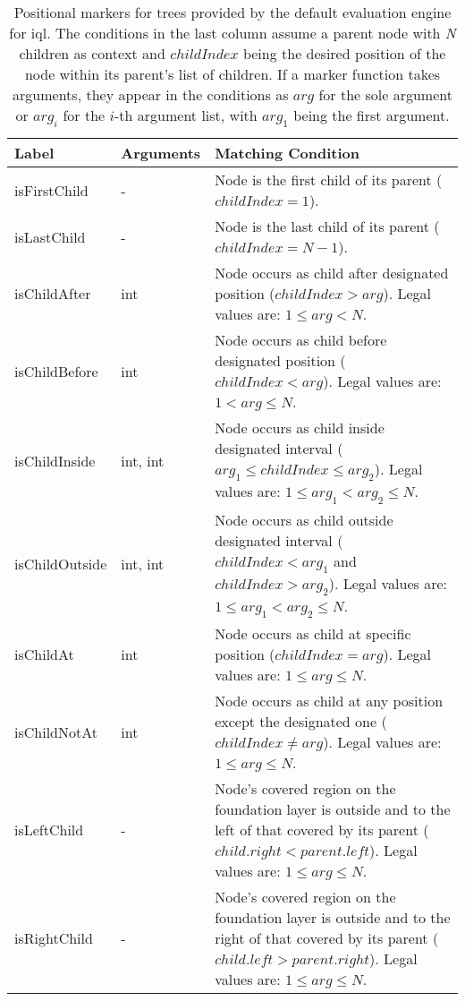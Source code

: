 \documentclass[11pt,a4paper]{article}
\begin{document}
\begin{table}[!htb]\centering
	\begin{tabular}{|p{}|p{}|p{}|}
		\hline 
		\textbf{Label} & \textbf{Arguments} & \textbf{Matching Condition} \\ 
		\hline 
		\hline  
		isFirstChild & - & Node is the first child of its parent ($childIndex = 1$). \\ 
		\hline 
		isLastChild & - & Node is the last child of its parent ($childIndex = N-1$). \\  
		\hline 
		isChildAfter & int & Node occurs as child after designated position ($childIndex > arg$). Legal values are: $1 \leq arg < N$. \\  
		\hline 
		isChildBefore & int & Node occurs as child before designated position ($childIndex < arg$). Legal values are: $1 < arg \leq N$. \\  
		\hline 
		isChildInside & int, int & Node occurs as child inside designated interval ($arg_1 \leq childIndex \leq arg_2$). Legal values are: $1 \leq arg_1 < arg_2 \leq N$. \\  
		\hline 
		isChildOutside & int, int & Node occurs as child outside designated interval ($childIndex < arg_1$ and $childIndex>arg_2$). Legal values are: $1 \leq arg_1 < arg_2 \leq N$. \\  
		\hline 
		isChildAt & int & Node occurs as child at specific position ($childIndex = arg$). Legal values are: $1 \leq arg \leq N$. \\  
		\hline 
		isChildNotAt & int & Node occurs as child at any position except the designated one ($childIndex \neq arg$). Legal values are: $1 \leq arg \leq N$. \\  
		\hline 
		isLeftChild & - & Node's covered region on the foundation layer is outside and to the left of that covered by its parent ($child.right < parent.left$). Legal values are: $1 \leq arg \leq N$. \\  
		\hline 
		isRightChild & - & Node's covered region on the foundation layer is outside and to the right of that covered by its parent ($child.left > parent.right$). Legal values are: $1 \leq arg \leq N$. \\  
		\hline 
	\end{tabular}
	\caption[Tree positional markers]{Positional markers for trees provided by the default evaluation engine for \ac{iql}. The conditions in the last column assume a parent node with \textit{N} children as context and $childIndex$ being the desired position of the node within its parent's list of children. If a marker function takes arguments, they appear in the conditions as $arg$ for the sole argument or $arg_i$ for the $i$-th argument list, with $arg_1$ being the first argument.}
	\label{tab:tree-position-markers}
\end{table}
\end{document}
